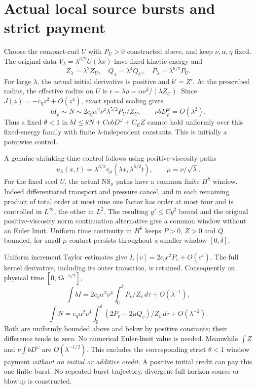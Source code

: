 \documentclass[11pt]{article}
\begin{document}
\section{Actual local source bursts and strict payment}
Choose the compact-curl $U$ with $P_U>0$ constructed above, and keep
$\nu,\alpha,\eta$ fixed. The original data
$V_\lambda=\lambda^{3/2}U(\lambda x)$ have fixed kinetic energy and
\[
 Z_\lambda=\lambda^2Z_U,\quad Q_\lambda=\lambda^4Q_U,\quad
 P_\lambda=\lambda^{9/2}P_U.
\]
For large $\lambda$, the actual initial derivative is positive and
$b'=Z'$. At the prescribed radius, the effective radius on $U$ is
$\epsilon=\lambda\rho=\alpha\nu^2/(\lambda Z_U)$. Since
$J(z)=-c_\eta z^2+O(z^4)$, exact spatial scaling gives
\[
 bI_\rho\sim N\sim
     2c_\eta\alpha^2\nu^4\lambda^{5/2}P_U/Z_U,
 \qquad \nu bD^\omega_\rho=O(\lambda^2).
\]
Thus a fixed $\theta<1$ in $bI\le\theta N+C\nu bD^\omega+C_EZ$
cannot hold uniformly over this fixed-energy family with finite
$\lambda$-independent constants. This is initially a pointwise control.

A genuine shrinking-time control follows using positive-viscosity paths
\[
 u_\lambda(x,t)=\lambda^{3/2}v_\mu(\lambda x,\lambda^{5/2}t),
 \qquad\mu=\nu/\sqrt\lambda.
\]
For the fixed seed $U$, the actual NS$_\mu$ paths have a common finite
$H^8$ window. Indeed differentiated transport and pressure cancel, and in
each remaining product of total order at most nine one factor has order
at most four and is controlled in $L^\infty$, the other in $L^2$.
The resulting $y'\le Cy^2$ bound and the original positive-viscosity norm
continuation alternative give a common window without an Euler limit.
Uniform time continuity in $H^6$ keeps $P>0$, $Z>0$ and $Q$ bounded;
for small $\mu$ contact persists throughout a smaller window $[0,\delta]$.

Uniform increment Taylor estimates give
$I_\epsilon[v]=2c_\eta\epsilon^2P_v+O(\epsilon^3)$.
The full kernel derivative, including its outer transition, is retained.
Consequently on physical time $[0,\delta\lambda^{-5/2}]$,
\[
 \int bI=2c_\eta\alpha^2\nu^4\int_0^\delta P_v/Z_v\,d\tau
                    +O(\lambda^{-1}),
\]
\[
 \int N=c_\eta\alpha^2\nu^4
          \int_0^\delta(2P_v-2\mu Q_v)/Z_v\,d\tau
                    +O(\lambda^{-2}).
\]
Both are uniformly bounded above and below by positive constants;
their difference tends to zero. No numerical Euler-limit value is needed.
Meanwhile $\int Z$ and $\nu\int bD^\omega$ are $O(\lambda^{-1/2})$.
This excludes the corresponding strict $\theta<1$ window payment
\emph{without an initial or additive credit}. A positive initial credit
can pay this one finite burst. No repeated-burst trajectory, divergent
full-horizon source or blowup is constructed.
\end{document}
